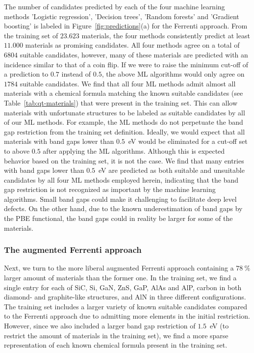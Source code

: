 \documentclass[superscriptaddress,unsortedaddress,
 amsmath,amssymb,
 aps,
]{revtex4-2}
\begin{document}


The number of candidates predicted by each of the four machine learning methods 'Logistic regression', 'Decision trees', 'Random forests' and 'Gradient boosting' is labeled in Figure~\ref{fig:predictions}(a) for the Ferrenti approach. 
From the training set of $23.623$ materials, the four methods consistently predict at least $11.000$ materials as promising candidates. All four methods agree on a total of $6804$ suitable candidates, however, many of these materials are predicted with an incidence similar to that of a coin flip. 
If we were to raise the minimum cut-off of a prediction to $0.7$ instead of $0.5$, the above ML algorithms would only agree on $1784$ suitable candidates. 
We find that all four ML methods admit almost all materials with a chemical formula matching the known suitable candidates (see Table~\ref{tab:qt-materials}) that were present in the training set. 
This can allow materials with unfortunate structures to be labeled as suitable candidates by all of our ML methods. 
For example, the ML methods do not perpetuate the band gap restriction from the training set definition. 
Ideally, we would expect that all materials with band gaps lower than $0.5$~eV would be eliminated for a cut-off set to above $0.5$ after applying the ML algorithms.  
Although this is expected behavior based on the training set, it is not the case. 
We find that many entries with band gaps lower than $0.5$~eV are predicted as both suitable and unsuitable candidates by all four ML methods employed herein, 
indicating that the band gap restriction is not recognized as important by the machine learning algorithms. 
Small band gaps could make it challenging to facilitate deep level defects. 
On the other hand, due to the known underestimation of band gaps by the PBE functional, the band gaps could in reality be larger for some of the materials. 

\subsubsection*{The augmented Ferrenti approach}
Next, we turn to the more liberal augmented Ferrenti approach containing a $78 \ \%$ larger amount of materials than the former one. In the training set, we find a single entry for each of SiC, Si, GaN, ZnS, GaP, AlAs and AlP, carbon in both diamond- and graphite-like structures, and AlN in three different configurations. The training set includes a larger variety of 
known 
suitable candidates compared to the Ferrenti approach due to admitting more elements in the initial restriction. However, since we also included a larger band gap restriction of $1.5$~eV (to restrict the amount of materials in the training set), we find a more sparse representation of each known 
chemical formula present in the training set. 
\end{document}
